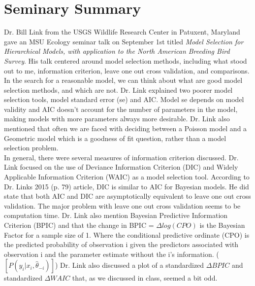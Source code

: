 \documentclass{article}
\begin{document}
\section{Seminary Summary}
Dr. Bill Link from the USGS Wildlife Research Center in Patuxent, Maryland gave an MSU Ecology seminar talk on September 1st titled {\it Model Selection for Hierarchical Models, with application to the North American Breeding Bird Survey}. His talk centered around model selection methods, including what stood out to me, information criterion, leave one out cross validation, and comparisons. \\

In the search for a reasonable model, we can think about what are good model selection methods, and which are not. Dr. Link explained two poorer model selection tools, model standard error (se) and AIC. Model se depends on model validity and AIC doesn't account for the number of parameters in the model, making models with more parameters always more desirable. Dr. Link also mentioned that often we are faced with deciding between a Poisson model and a Geometric model which is a goodness of fit question, rather than a model selection problem.\\

In general, there were several measures of information criterion discussed. Dr. Link focused on the use of Deviance Information Criterion (DIC) and Widely Applicable Information Criterion (WAIC) as a model selection tool. According to Dr. Links 2015 (p. 79) article, DIC is similar to AIC for Bayesian models. He did state that both AIC and DIC are asymptotically equivalent to leave one out cross validation. The major problem with leave one out cross validation seems to be computation time. Dr. Link also mention Bayesian Predictive Information Criterion (BPIC) and that the change in BPIC = $\Delta log(CPO)$ is the Bayesian Factor for a sample size of 1. Where the conditional predictive ordinate (CPO) is the predicted probability of observation i given the predictors associated with observation i and the parameter estimate without the i's information. ($[P(y_{i}|x_{i},\hat{\theta}_{-i})]$) Dr. Link also discussed a plot of a standardized $\Delta BPIC$ and standardized $\Delta WAIC$ that, as we discussed in class, seemed a bit odd.\\
\end{document}
